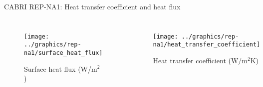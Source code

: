 \begin{frame}{CABRI REP-NA1: Heat transfer coefficient and heat flux}
  \footnotesize 

  \begin{columns}[t]


  \begin{figure}[h]
    \texttt{[image: ../graphics/rep-na1/surface\_heat\_flux]}
    \caption{Surface heat flux (W/m$^2$)}
  \end{figure}


  \begin{figure}[h]
    \texttt{[image: ../graphics/rep-na1/heat\_transfer\_coefficient]}
    \caption{Heat transfer coefficient (W/m$^2$K)}
  \end{figure}

  \end{columns}

\end{frame}
